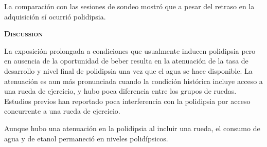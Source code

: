 \documentclass[a4paper,12pt]{article}
\begin{document}
La comparación con las sesiones de sondeo mostró que a pesar del retraso en la adquisición sí ocurrió polidipsia.

{\scshape\bfseries Discussion}

La exposición prolongada a condiciones que usualmente inducen polidipsia pero en ausencia de la oportunidad de beber resulta en la atenuación de la tasa de desarrollo y nivel final de polidipsia una vez que el agua se hace disponible. La atenuación es aun más pronunciada cuando la condición histórica incluye acceso a una rueda de ejercicio, y hubo poca diferencia entre los grupos de ruedas. Estudios previos han reportado poca interferencia con la polidipsia por acceso concurrente a una rueda de ejercicio.

Aunque hubo una atenuación en la polidipsia al incluir una rueda, el consumo de agua y de etanol permaneció en niveles polidípsicos.
\end{document}
